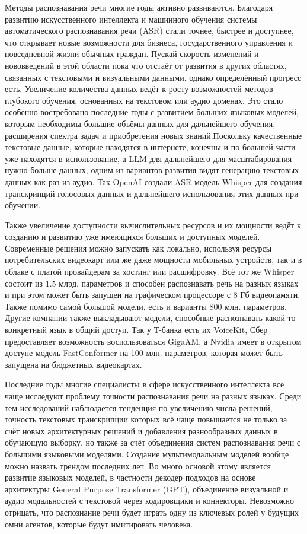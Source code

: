 Методы распознавания речи многие годы активно развиваются.
Благодаря развитию искусственного интеллекта и машинного обучения системы автоматического распознавания речи (ASR) стали точнее, быстрее и доступнее, что открывает новые возможности для бизнеса, государственного управления и повседневной жизни обычных граждан.
Пускай скорость изменений и нововведений в этой области пока что отстаёт от развития в других областях, связанных с текстовыми и визуальными данными, однако определённый прогресс есть.
Увеличение количества данных ведёт к росту возможностей методов глубокого обучения, основанных на текстовом или аудио доменах.
Это стало особенно востребовано последние годы с развитием больших языковых моделей, которым необходимы большие объёмы данных для дальнейшего обучения, расширения спектра задач и приобретения новых знаний.Поскольку качественные текстовые данные, которые находятся в интернете, конечны и по большей части уже находятся в использование, а LLM для дальнейшего для масштабирования нужно больше данных, одним из вариантов развития видят генерацию текстовых данных как раз из аудио.
Так OpenAI создали ASR модель Whisper для создания транскрипций голосовых данных и дальнейшего использования этих данных при обучении.

Также увеличение доступности вычислительных ресурсов и их мощности ведёт к созданию и развитию уже имеющихся больших и доступных моделей.
Современные решения можно запускать как локально, используя ресурсы потребительских видеокарт или же даже мощности мобильных устройств, так и в облаке с платой провайдерам за хостинг или расшифровку.
Всё тот же Whisper состоит из 1.5 млрд. параметров и способен распознавать речь на разных языках и при этом может быть запущен на графическом процессоре с 8 Гб видеопамяти.
Также помимо самой большой модели, есть и варианты 800 млн. параметров.
Другие компании также выкладывают модели, способные распознавать какой-то конкретный язык в общий доступ.
Так у Т-банка есть их VoiceKit, Сбер предоставляет возможность воспользоваться GigaAM, а Nvidia имеет в открытом доступе модель FastConformer на 100 млн. параметров, которая может быть запущена на бюджетных видеокартах.

Последние годы многие специалисты в сфере искусственного интеллекта всё чаще исследуют проблему точности распознавания речи на разных языках.
Среди тем исследований наблюдается тенденция по увеличению числа решений, точность текстовых транскрипции которых всё чаще повышается не только за счёт новых архитектурных решений и добавления разнообразных данных в обучающую выборку, но также за счёт объединения систем распознавания речи с большими языковыми моделями.
Создание мультимодальным моделей вообще можно назвать трендом последних лет.
Во много основой этому является развитие языковых моделей, в частности декодер подходов на основе архитектуры General Purpose Transformer (GPT), объединение визуальной и аудио модальностей с текстовой через кодировщики и коннекторы.
Невозможно отрицать, что распознание речи будет играть одну из ключевых ролей у будущих омни агентов, которые будут имитировать человека.

